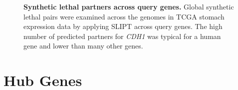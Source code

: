 \begin{figure}[!ht]
  \begin{center}
   \end{center}
   \caption[Synthetic lethal partners across query genes]{\small \textbf{Synthetic lethal partners across query genes.} Global synthetic lethal pairs were examined across the \glspl{genome} in \gls{TCGA} stomach expression data by applying SLIPT across query genes. The high number of predicted partners for \textit{CDH1} was typical for a human gene and lower than many other genes.
   }
\label{fig:global_SL_stad}
\end{figure}


\FloatBarrier

\clearpage

\section{Hub Genes}


